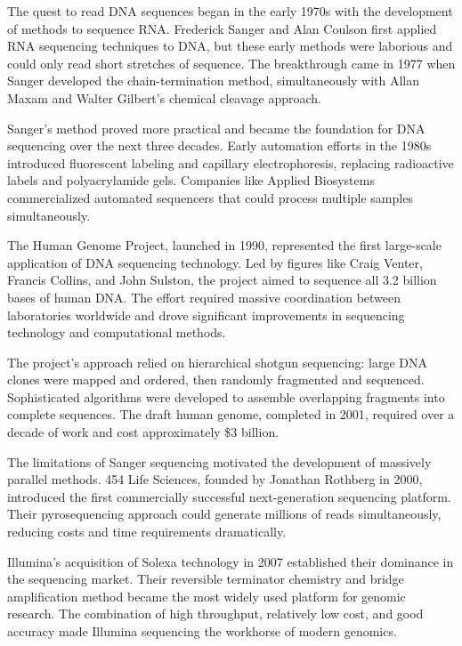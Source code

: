 \begin{historical}
The quest to read DNA sequences began in the early 1970s with the development of methods to sequence RNA. Frederick Sanger and Alan Coulson first applied RNA sequencing techniques to DNA, but these early methods were laborious and could only read short stretches of sequence. The breakthrough came in 1977 when Sanger developed the chain-termination method, simultaneously with Allan Maxam and Walter Gilbert's chemical cleavage approach.

Sanger's method proved more practical and became the foundation for DNA sequencing over the next three decades. Early automation efforts in the 1980s introduced fluorescent labeling and capillary electrophoresis, replacing radioactive labels and polyacrylamide gels. Companies like Applied Biosystems commercialized automated sequencers that could process multiple samples simultaneously.

The Human Genome Project, launched in 1990, represented the first large-scale application of DNA sequencing technology. Led by figures like Craig Venter, Francis Collins, and John Sulston, the project aimed to sequence all 3.2 billion bases of human DNA. The effort required massive coordination between laboratories worldwide and drove significant improvements in sequencing technology and computational methods.

The project's approach relied on hierarchical shotgun sequencing: large DNA clones were mapped and ordered, then randomly fragmented and sequenced. Sophisticated algorithms were developed to assemble overlapping fragments into complete sequences. The draft human genome, completed in 2001, required over a decade of work and cost approximately \$3 billion.

The limitations of Sanger sequencing motivated the development of massively parallel methods. 454 Life Sciences, founded by Jonathan Rothberg in 2000, introduced the first commercially successful next-generation sequencing platform. Their pyrosequencing approach could generate millions of reads simultaneously, reducing costs and time requirements dramatically.

Illumina's acquisition of Solexa technology in 2007 established their dominance in the sequencing market. Their reversible terminator chemistry and bridge amplification method became the most widely used platform for genomic research. The combination of high throughput, relatively low cost, and good accuracy made Illumina sequencing the workhorse of modern genomics.


\end{historical}
